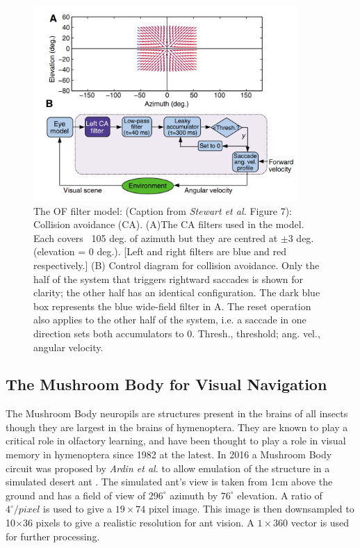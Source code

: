 \documentclass[a4paper,11pt,twoside,openright]{article}
\begin{document}
\begin{figure}[h]
 
  \centering
  \includegraphics[width=0.9\textwidth]{Stewart2010CAModel}
  \caption{
    \label{fig:stewartca} The OF filter model: (Caption from \textit{Stewart et al.} Figure 7):
    Collision avoidance (CA). (A)The CA filters used in the
    model. Each covers ~105 deg. of azimuth but they are centred
    at $\pm 3$ deg. (elevation = 0 deg.). [Left and right filters
    are blue and red respectively.] (B) Control diagram for collision
    avoidance. Only the half of the system that triggers rightward
    saccades is shown for clarity; the other half has an identical
    configuration. The dark blue box represents the blue wide-field
    filter in A. The reset operation also applies to the other half of
    the system, i.e. a saccade in one direction sets both
    accumulators to 0. Thresh., threshold; ang. vel., angular velocity.
  }
 
\end{figure}

\subsection{ The Mushroom Body for Visual Navigation } \label{MBBackground}
The Mushroom Body neuropils are structures present in the brains of all insects though they are
largest in the brains of hymenoptera. They are known to play a critical role in olfactory
learning, and have been thought to play a role in visual memory in hymenoptera since 1982
at the latest\cite{Mobbs1982}. In 2016 a Mushroom Body circuit was proposed by \textit{Ardin et al.}
to allow emulation of the structure in a simulated desert ant \cite{Ardin2016}. The simulated
ant's view is taken from 1cm above the ground and has a field of view of $296^{\circ}$ azimuth
by $76^{\circ}$ elevation. A ratio of $4^{\circ}/pixel$ is used to give a $19\times74$ pixel image.
This image is then downsampled to 10$\times$36 pixels to give a realistic resolution for ant vision.
A $1\times360$ vector is used for further processing.
\newline
\end{document}

